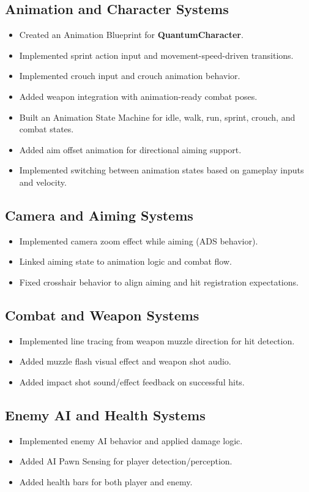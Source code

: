 \documentclass[12pt]{article}
\begin{document}
\subsection{Animation and Character Systems}
\begin{itemize}[leftmargin=*]
  \item Created an Animation Blueprint for \textbf{QuantumCharacter}.
  \item Implemented sprint action input and movement-speed-driven transitions.
  \item Implemented crouch input and crouch animation behavior.
  \item Added weapon integration with animation-ready combat poses.
  \item Built an Animation State Machine for idle, walk, run, sprint, crouch, and combat states.
  \item Added aim offset animation for directional aiming support.
  \item Implemented switching between animation states based on gameplay inputs and velocity.
\end{itemize}

\subsection{Camera and Aiming Systems}
\begin{itemize}[leftmargin=*]
  \item Implemented camera zoom effect while aiming (ADS behavior).
  \item Linked aiming state to animation logic and combat flow.
  \item Fixed crosshair behavior to align aiming and hit registration expectations.
\end{itemize}

\subsection{Combat and Weapon Systems}
\begin{itemize}[leftmargin=*]
  \item Implemented line tracing from weapon muzzle direction for hit detection.
  \item Added muzzle flash visual effect and weapon shot audio.
  \item Added impact shot sound/effect feedback on successful hits.
\end{itemize}

\subsection{Enemy AI and Health Systems}
\begin{itemize}[leftmargin=*]
  \item Implemented enemy AI behavior and applied damage logic.
  \item Added AI Pawn Sensing for player detection/perception.
  \item Added health bars for both player and enemy.
\end{itemize}
\end{document}
